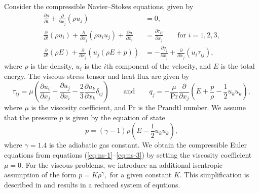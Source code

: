 \documentclass[review]{siamart}
\begin{document}
Consider the compressible Navier--Stokes equations, given by
\begin{align}
    \label{eq:ns-1}
	 \frac{\partial\rho}{\partial t} + \frac{\partial}{\partial x_j}(\rho u_j)
	 	&= 0, \\
    \label{eq:ns-2}
    \frac{\partial}{\partial t}(\rho u_i) + \frac{\partial}{\partial x_j} (\rho u_i u_j) + \frac{\partial p}{\partial x_i}
      &= \frac{\partial \tau_{ij}}{\partial x_j} \qquad \text{for $i=1,2,3,$}\\
    \label{eq:ns-3}
	 \frac{\partial}{\partial t}(\rho E) + \frac{\partial}{\partial x_j} \left(u_j(\rho E + p) \right)
	 	&= -\frac{\partial q_j}{\partial x_j} + \frac{\partial}{\partial x_j} (u_i \tau_{ij}),
\end{align}
where $\rho$ is the density, $u_i$ is the $i$th component of the velocity, and $E$ is the total energy.
The viscous stress tensor and heat flux are given by
\begin{equation}
	\tau_{ij} = \mu\left(
		\frac{\partial u_i}{\partial x_j} + \frac{\partial u_j}{\partial x_i}
		- \frac{2}{3} \frac{\partial u_k}{\partial x_k}  \delta_{ij}
	\right)
	\qquad\text{and}\qquad
	q_j = - \frac{\mu}{\mathrm{Pr}} \frac{\partial}{\partial x_j} \left(E + \frac{p}{\rho} - \frac{1}{2} u_k u_k \right),
\end{equation}
where $\mu$ is the viscosity coefficient, and $\mathrm{Pr}$ is the Prandtl number.
We assume that the pressure $p$ is given by the equation of state
\begin{equation} \label{eq:eos}
    p = (\gamma - 1)\rho \left( E - \frac{1}{2} u_k u_k \right),
\end{equation}
where $\gamma = 1.4$ is the adiabatic gas constant.
We obtain the compressible Euler equations from equations (\ref{eq:ns-1}--\ref{eq:ns-3}) by setting the viscosity coefficient $\mu = 0$.
For the viscous problems, we introduce an additional isentropic assumption of the form $p = K \rho^\gamma,$ for a given constant $K$.
This simplification is described in \cite{Kanner2015} and results in a reduced system of equtions.

\end{document}
